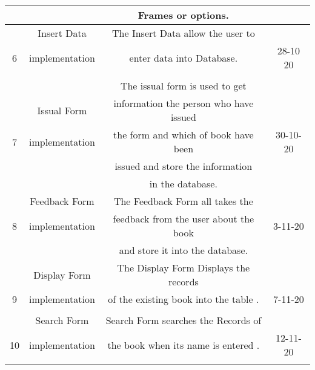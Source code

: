 \documentclass{article}
\begin{document}
\begin{center}
\begin{tabular}{ |c|c|c|c|}
  &                  & Frames or options.                        &       \\
  \hline
& Insert Data  &  The Insert Data allow  the user to       &     \\
 6 & implementation  &   enter data into Database.               & 28-10 20     \\
    &                  &                                           &     \\
 \hline
 & & The issual form is used to get  &    \\ 
  &   Issual Form  & information the person who have issued &     \\
 7 &   implementation &  the form and which of book have been  & 30-10-20     \\
  &                  &  issued and store the information  &       \\
   &                 &   in the database.                        &  \\
  \hline
&   Feedback Form  & The Feedback Form all takes the &   \\ 
  8& implementation &  feedback from the user about the book   &  3-11-20  \\
  &                  &   and store it into the database. &     \\
 \hline
 &    Display Form   & The Display Form Displays the records &   \\ 
 9 & implementation &   of the existing book into the table .   & 7-11-20   \\
  &                  &                                           &     \\
  \hline
 &  Search Form  & Search Form searches the Records of &    \\ 
 10 & implementation  & the book when its name is entered .  & 12-11-20    \\
  &                  &                                           &      \\
 \hline
\end{tabular}
\end{center}

\newpage
\end{document}
